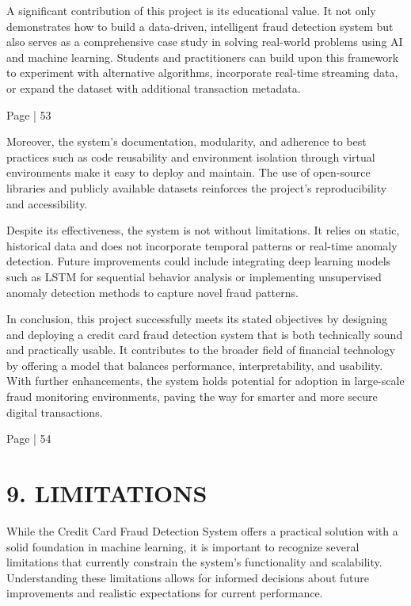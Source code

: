 \documentclass[11pt,a4paper]{article}
\begin{document}
A significant contribution of this project is its educational value. It not only demonstrates how to 
build a data-driven, intelligent fraud detection system but also serves as a comprehensive case study 
in solving real-world problems using AI and machine learning. Students and practitioners can build 
upon this framework to experiment with alternative algorithms, incorporate real-time streaming 
data, or expand the dataset with additional transaction metadata. 

Page | 53  

\newpage

Moreover, the system's documentation, modularity, and adherence to best practices such as code 
reusability and environment isolation through virtual environments make it easy to deploy and 
maintain. The use of open-source libraries and publicly available datasets reinforces the project’s 
reproducibility and accessibility. 

Despite its effectiveness, the system is not without limitations. It relies on static, historical data and 
does not incorporate temporal patterns or real-time anomaly detection. Future improvements could 
include integrating deep learning models such as LSTM for sequential behavior analysis or 
implementing unsupervised anomaly detection methods to capture novel fraud patterns. 

In conclusion, this project successfully meets its stated objectives by designing and deploying a 
credit card fraud detection system that is both technically sound and practically usable. It 
contributes to the broader field of financial technology by offering a model that balances 
performance, interpretability, and usability. With further enhancements, the system holds potential 
for adoption in large-scale fraud monitoring environments, paving the way for smarter and more 
secure digital transactions. 

Page | 54  

\newpage

\section*{9. LIMITATIONS }

While the Credit Card Fraud Detection System offers a practical solution with a solid foundation in 
machine learning, it is important to recognize several limitations that currently constrain the 
system’s functionality and scalability. Understanding these limitations allows for informed 
decisions about future improvements and realistic expectations for current performance. 
\end{document}
